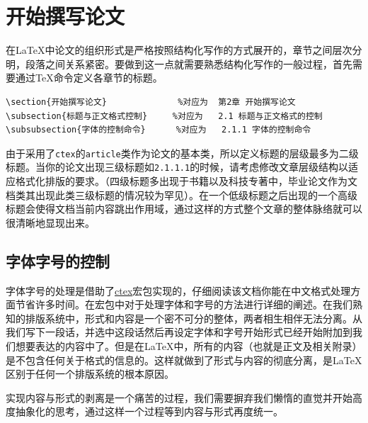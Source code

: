 \section{开始撰写论文}
在\LaTeX 中论文的组织形式是严格按照结构化写作的方式展开的，章节之间层次分明，段落之间关系紧密。要做到这一点就需要熟悉结构化写作的一般过程，首先需要通过\TeX 命令定义各章节的标题。
\begin{verbatim}
\section{开始撰写论文}              %对应为  第2章 开始撰写论文
\subsection{标题与正文格式控制}     %对应为   2.1 标题与正文格式的控制 
\subsubsection{字体的控制命令}      %对应为   2.1.1 字体的控制命令
\end{verbatim}
由于采用了\verb|ctex|的\verb|article|类作为论文的基本类，所以定义标题的层级最多为二级标题。当你的论文出现三级标题如\verb|2.1.1.1|的时候，请考虑修改文章层级结构以适应格式化排版的要求。（四级标题多出现于书籍以及科技专著中，毕业论文作为文档类其出现此类三级标题的情况较为罕见）。在一个低级标题之后出现的一个高级标题会使得文档当前内容跳出作用域，通过这样的方式整个文章的整体脉络就可以很清晰地显现出来。
\subsection{字体字号的控制}
字体字号的处理是借助了\href{http://mirror.hust.edu.cn/CTAN/language/chinese/ctex/doc/ctex.pdf}{ctex}宏包实现的，仔细阅读该文档你能在中文格式处理方面节省许多时间。在宏包中对于处理字体和字号的方法进行详细的阐述。在我们熟知的排版系统中，形式和内容是一个密不可分的整体，两者相生相伴无法分离。从我们写下一段话，并选中这段话然后再设定字体和字号开始形式已经开始附加到我们想要表达的内容中了。但是在\LaTeX 中，所有的内容（也就是正文及相关附录）是不包含任何关于格式的信息的。这样就做到了形式与内容的彻底分离，是\LaTeX 区别于任何一个排版系统的根本原因。

实现内容与形式的剥离是一个痛苦的过程，我们需要摒弃我们懒惰的直觉并开始高度抽象化的思考，通过这样一个过程等到内容与形式再度统一。
